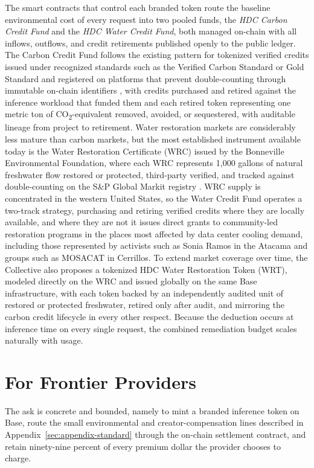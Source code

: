 \documentclass[10pt,a4paper,twocolumn]{article}
\begin{document}
The smart contracts that control each branded token route the baseline environmental cost of every request into two pooled funds, the \emph{HDC Carbon Credit Fund} and the \emph{HDC Water Credit Fund}, both managed on-chain with all inflows, outflows, and credit retirements published openly to the public ledger. The Carbon Credit Fund follows the existing pattern for tokenized verified credits issued under recognized standards such as the Verified Carbon Standard or Gold Standard and registered on platforms that prevent double-counting through immutable on-chain identifiers \citep{rwa2026carbontoken}, with credits purchased and retired against the inference workload that funded them and each retired token representing one metric ton of CO\textsubscript{2}-equivalent removed, avoided, or sequestered, with auditable lineage from project to retirement. Water restoration markets are considerably less mature than carbon markets, but the most established instrument available today is the Water Restoration Certificate (WRC) issued by the Bonneville Environmental Foundation, where each WRC represents 1{,}000 gallons of natural freshwater flow restored or protected, third-party verified, and tracked against double-counting on the S\&P Global Markit registry \citep{bef2024wrc,terrapass2026wrc}. WRC supply is concentrated in the western United States, so the Water Credit Fund operates a two-track strategy, purchasing and retiring verified credits where they are locally available, and where they are not it issues direct grants to community-led restoration programs in the places most affected by data center cooling demand, including those represented by activists such as Sonia Ramos in the Atacama and groups such as MOSACAT in Cerrillos. To extend market coverage over time, the Collective also proposes a tokenized HDC Water Restoration Token (WRT), modeled directly on the WRC and issued globally on the same Base infrastructure, with each token backed by an independently audited unit of restored or protected freshwater, retired only after audit, and mirroring the carbon credit lifecycle in every other respect. Because the deduction occurs at inference time on every single request, the combined remediation budget scales naturally with usage.

\section{For Frontier Providers}
\label{sec:why-frontier}

The ask is concrete and bounded, namely to mint a branded inference token on Base, route the small environmental and creator-compensation lines described in Appendix~\ref{sec:appendix-standard} through the on-chain settlement contract, and retain ninety-nine percent of every premium dollar the provider chooses to charge.
\end{document}
